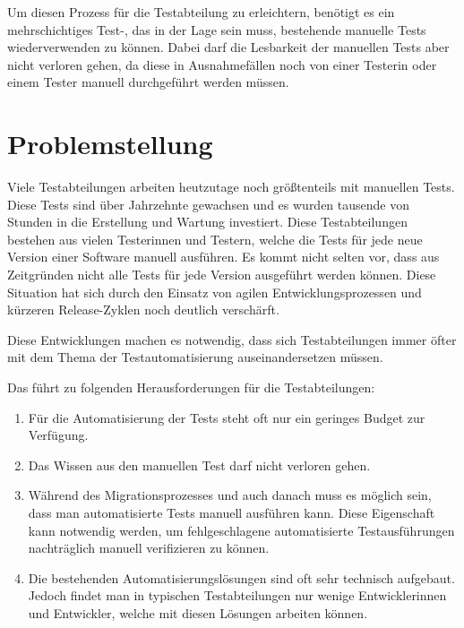 \SuperPar
Um diesen Prozess für die Testabteilung zu erleichtern, benötigt es ein mehrschichtiges Test-, das in der Lage sein muss, bestehende manuelle Tests wiederverwenden zu können. Dabei darf die Lesbarkeit der manuellen Tests aber nicht verloren gehen, da diese in Ausnahmefällen noch von einer Testerin oder einem Tester manuell durchgeführt werden müssen.


\section{Problemstellung}

Viele Testabteilungen arbeiten heutzutage noch größtenteils mit manuellen Tests. Diese Tests sind über Jahrzehnte gewachsen und es wurden tausende von Stunden in die Erstellung und Wartung investiert. Diese Testabteilungen bestehen aus vielen Testerinnen und Testern, welche die Tests für jede neue Version einer Software manuell ausführen. Es kommt nicht selten vor, dass aus Zeitgründen nicht alle Tests für jede Version ausgeführt werden können. Diese Situation hat sich durch den Einsatz von agilen Entwicklungsprozessen und kürzeren Release-Zyklen noch deutlich verschärft. 

\SuperPar
Diese Entwicklungen machen es notwendig, dass sich Testabteilungen immer öfter mit dem Thema der Testautomatisierung auseinandersetzen müssen. 

\SuperPar
Das führt zu folgenden Herausforderungen für die Testabteilungen:\\

\begin{enumerate}

\item Für die Automatisierung der Tests steht oft nur ein geringes Budget zur Verfügung.\\
	
\item Das Wissen aus den manuellen Test darf nicht verloren gehen.\\
	
\item Während des Migrationsprozesses und auch danach muss es möglich sein, dass man automatisierte Tests manuell ausführen kann. Diese Eigenschaft kann notwendig werden, um fehlgeschlagene automatisierte Testausführungen nachträglich manuell verifizieren zu können.\\

\item Die bestehenden Automatisierungslösungen sind oft sehr technisch aufgebaut. Jedoch findet man in typischen Testabteilungen nur wenige Entwicklerinnen und Entwickler, welche mit diesen Lösungen arbeiten können.

\end{enumerate}

